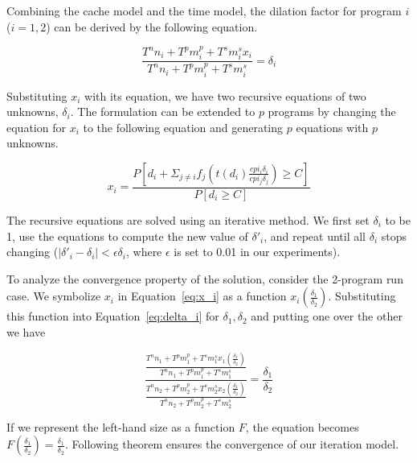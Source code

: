 
Combining the cache model and the time model, the dilation factor for
program $i$($i=1,2$) can be derived by the following equation. 

\begin{equation}
\label{eq:delta_i}
\frac{T^n n_i + T^p m^p_i + T^s m^s_i x_i}{T^n n_i + T^p m^p_i + T^s m^s_i} = \delta_i
\end{equation}

\noindent Substituting $x_i$ with its equation, we have two recursive
equations of two unknowns, $\delta_i$.  The formulation can be
extended to $p$ programs by changing the equation for $x_i$ to the
following equation and generating $p$ equations with $p$ unknowns.  

\begin{equation}
\label{eq:x_i}
x_i = \frac{P\left[d_i + \Sigma_{j\ne i}f_j\left(t(d_i)\frac{cpi_i\delta_i}{cpi_j\delta_j}\right) \ge C\right]}{P\left[d_i \ge C\right]}
\end{equation}

The recursive equations are solved using an iterative method.  We first
set $\delta_i$ to be 1, use the equations to compute the new value of
$\delta'_i$, and repeat until all $\delta_i$ stops changing
($|\delta'_i-\delta_i| < \epsilon \delta_i$, where $\epsilon$ is set
to 0.01 in our experiments).

To analyze the convergence property of the solution, consider the
2-program run case.  We symbolize $x_i$ in Equation~\ref{eq:x_i} as a
function $x_i(\frac{\delta_1}{\delta_2})$.  Substituting this function
into Equation~\ref{eq:delta_i} for $\delta_1,\delta_2$ and putting one
over the other we have

\begin{equation}
\label{eq:fp}
\frac{\frac{T^n n_1 + T^p m^p_1 + T^s m^s_1 x_1\left(\frac{\delta_1}{\delta_2}\right)}{T^n n_1 + T^p m^p_1 + T^s m^s_1} }
{\frac{T^n n_2 + T^p m^p_2 + T^s m^s_2 x_2\left(\frac{\delta_1}{\delta_2}\right)}{T^n n_2 + T^p m^p_2 + T^s m^s_2} }  = \frac{\delta_1}{\delta_2}
\end{equation}

\noindent If we represent the left-hand size as a function $F$, the
equation becomes $F(\frac{\delta_1}{\delta_2}) =
\frac{\delta_1}{\delta_2}$.  Following theorem ensures the convergence of our 
iteration model.

